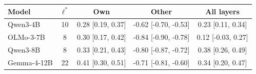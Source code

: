 \begin{tabular}{@{}lcccc@{}}
\toprule
Model & $\ell^*$ & Own & Other & All layers \\
\midrule
Qwen3-4B & 10 & 0.28 [0.19, 0.37] & -0.62 [-0.70, -0.53] & 0.23 [0.11, 0.34] \\
OLMo-3-7B & 8 & 0.30 [0.17, 0.42] & -0.84 [-0.90, -0.78] & 0.12 [-0.03, 0.27] \\
Qwen3-8B & 8 & 0.33 [0.21, 0.43] & -0.80 [-0.87, -0.72] & 0.38 [0.26, 0.49] \\
Gemma-4-12B & 22 & 0.41 [0.30, 0.51] & -0.71 [-0.81, -0.60] & 0.34 [0.20, 0.47] \\
\bottomrule
\end{tabular}
